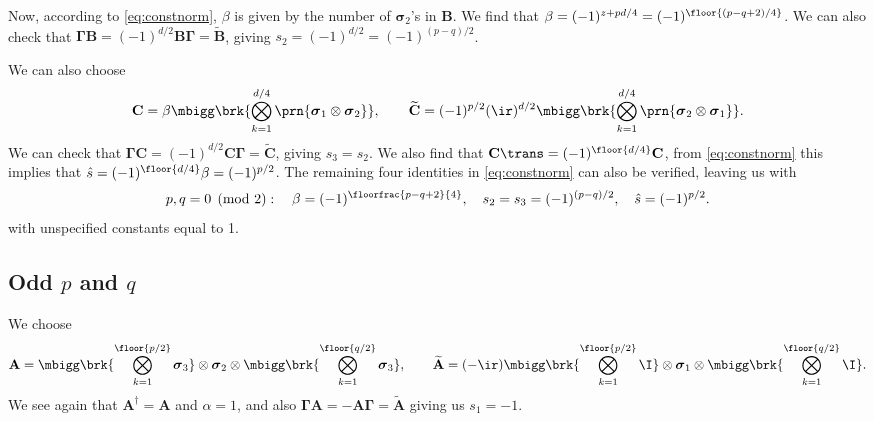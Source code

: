\documentclass[11pt]{article}
\newcommand{\Gammab}{\boldsymbol{\Gamma}}
\newcommand{\A}{\mathbf{A}}
\newcommand{\B}{\mathbf{B}}
\renewcommand{\C}{\mathbf{C}}
\newcommand{\At}{\widetilde{\mathbf{A}}}
\newcommand{\Bt}{\widetilde{\mathbf{B}}}
\newcommand{\Ct}{\widetilde{\mathbf{C}}}
\newcommand{\sigmab}{\boldsymbol{\sigma}}
\begin{document}
Now, according to \cref{eq:constnorm}, $\beta$ is given by the number of $\sigmab_2$'s in $\B$.
We find that \( \beta = (-1)^{z + pd/4} = (-1)^{\floor{(p-q+2)/4}} \).
We can also check that $\Gammab \B = (-1)^{d/2}\B \Gammab = \Bt$, giving $s_2 = (-1)^{d/2} = (-1)^{(p-q)/2}$.

We can also choose
%
\begin{equation*}
  \C =  \beta \mbigg\brk{\bigotimes_{k=1}^{d/4} \prn{\sigmab_1 \otimes \sigmab_2}},
  \qquad
  \Ct = (-1)^{p/2} (\ir)^{d/2}
        \mbigg\brk{\bigotimes_{k=1}^{d/4} \prn{\sigmab_2 \otimes \sigmab_1}}.
\end{equation*}
%
We can check that $\Gammab \C = (-1)^{d/2}\C \Gammab = \Ct$, giving $s_3 = s_2$.
We also find that $\C\trans = (-1)^{\floor{d/4}} \C$, from \cref{eq:constnorm} this implies that
\( \hat{s} = (-1)^{\floor{d/4}} \beta = (-1)^{p/2} \).
The remaining four identities in \cref{eq:constnorm} can also be verified, leaving us with
%
\begin{equation}\label{eq:consteveneven}
  p, q = 0 \pmod 2 : \quad
  \beta = (-1)^{\floorfrac{p-q+2}{4}}, \quad
  s_2 = s_3 = (-1)^{(p-q)/2}, \quad
  \hat{s} = (-1)^{p/2}.
\end{equation}
%
with unspecified constants equal to 1.


\subsection{Odd \texorpdfstring{$p$ and $q$}{p and q}}\label{sec:oddodd}

We choose
%
\begin{equation*}
  \A =  \mbigg\brk{\bigotimes_{k=1}^{\floor{p/2}} \sigmab_3}
        \otimes \sigmab_2
        \otimes \mbigg\brk{\bigotimes_{k=1}^{\floor{q/2}} \sigmab_3},
  \qquad
  \At = (-\ir)
        \mbigg\brk{\bigotimes_{k=1}^{\floor{p/2}} \I}
        \otimes \sigmab_1
        \otimes \mbigg\brk{\bigotimes_{k=1}^{\floor{q/2}} \I}.
\end{equation*}
%
We see again that $\A^\dag = \A$ and $\alpha=1$, and also $\Gammab \A = - \A \Gammab =  \At$ giving us $s_1 = -1$.
\end{document}
